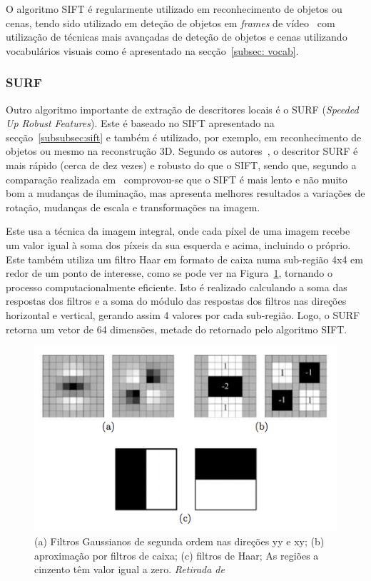 O algoritmo SIFT é regularmente utilizado em reconhecimento de objetos ou cenas, tendo sido utilizado em deteção de objetos em \textit{frames} de vídeo~\cite{Sivic2003, Sivic2006} com utilização de técnicas mais avançadas de deteção de objetos e cenas utilizando vocabulários visuais como é apresentado na secção~\ref{subsec: vocab}.

\subsubsection{SURF} \label{subsubsec:surf}

Outro algoritmo importante de extração de descritores locais é o SURF (\textit{Speeded Up Robust Features}). Este é baseado no SIFT apresentado na secção~\ref{subsubsec:sift} e também é utilizado, por exemplo, em reconhecimento de objetos ou mesmo na reconstrução 3D. Segundo os autores~\cite{Bay2006}, o descritor SURF é mais rápido (cerca de dez vezes) e robusto do que o SIFT, sendo que, segundo a comparação realizada em~\cite{Juan2009} comprovou-se que o SIFT é mais lento e não muito bom a mudanças de iluminação, mas apresenta melhores resultados a variações de rotação, mudanças de escala e transformações na imagem.

Este usa a técnica da imagem integral, onde cada píxel de uma imagem recebe um valor igual à soma dos píxeis da sua esquerda e acima, incluindo o próprio. Este também utiliza um filtro Haar em formato de caixa numa sub-região 4x4 em redor de um ponto de interesse, como se pode ver na Figura~\ref{fig:surf}, tornando o processo computacionalmente eficiente. Isto é realizado calculando a soma das respostas dos filtros e a soma do módulo das respostas dos filtros nas direções horizontal e vertical, gerando assim 4 valores por cada sub-região. Logo, o SURF retorna um vetor de 64 dimensões, metade do retornado pelo algoritmo SIFT.

\begin{figure}[h]
\centering
\includegraphics[width=0.7\linewidth]{./figures/surf}
\caption{ (a) Filtros Gaussianos de segunda ordem nas direções yy e xy; (b) aproximação por filtros de caixa; (c) filtros de Haar; As regiões a cinzento têm valor igual a zero. \textit{Retirada de}~\cite{Bay2006}}
\label{fig:surf}
\end{figure}

